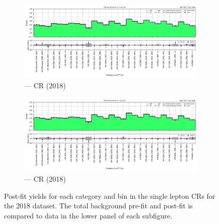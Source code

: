 \begin{figure}[htbp]
    \centering
    \begin{subfigure}[b]{\textwidth}
        \includegraphics[width=\textwidth]{chapters/higgstoinv/figures/mountain_ranges/2018/ttH/Wmunu_tree_fit_b-abs_values_ttH_cats.pdf}
        \caption{\ttH --- \singleMuCr \gls{CR} (2018)}
    \end{subfigure}

    \begin{subfigure}[b]{\textwidth}
        \includegraphics[width=\textwidth]{chapters/higgstoinv/figures/mountain_ranges/2018/ttH/Wenu_tree_fit_b-abs_values_ttH_cats.pdf}
        \caption{\ttH --- \singleEleCr \gls{CR} (2018)}
    \end{subfigure}
    \caption[Post-fit yields for each \ttH category and \ptmiss bin in the single lepton control regions for the 2018 dataset]{Post-fit yields for each \ttH category and \ptmiss bin in the single lepton \glspl{CR} for the 2018 dataset. The total background pre-fit and post-fit is compared to data in the lower panel of each subfigure.}
    \label{fig:htoinv_mountain_range_ttH_2018_single_lep_CRs}
\end{figure}

